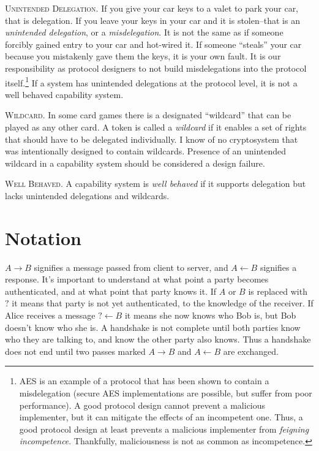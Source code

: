 \documentclass[12pt]{article}
\begin{document}
\textsc{Unintended Delegation}. If you give your car keys to a valet
to park your car, that is delegation. If you leave your keys in your
car and it is stolen--that is an \emph{unintended delegation},
or a \emph{misdelegation}. It is not the same as if someone forcibly
gained entry to your car and hot-wired it. If someone ``steals'' your
car because you mistakenly gave them the keys, it is your own fault.
It is our responsibility as protocol designers to not build
misdelegations into the protocol itself.\footnote{
  AES is an example of a protocol that has been shown to contain a
  misdelegation\cite{aestiming}  (secure AES implementations are possible,
  but suffer from poor performance).
  A good protocol design  cannot prevent a malicious implementer,
  but it can  mitigate the effects of
  an incompetent one. Thus, a good protocol design at least prevents
  a malicious implementer from \emph{feigning incompetence}\cite{underhanded}.
  Thankfully, maliciousness is not as common as incompetence.
} If a system has unintended delegations at the protocol level,
it is not a well behaved capability system.

\textsc{Wildcard}. In some card games there is a designated ``wildcard''
that can be played as any other card. A token is called a \emph{wildcard}
if it enables a set of rights that should have to be delegated
individually.
I know of no cryptosystem that was intentionally designed to contain
wildcards. Presence of an unintended wildcard in a capability
system should be considered a design failure.

\textsc{Well Behaved}. A capability system is
\emph{well behaved} if it supports delegation but lacks unintended
delegations and wildcards.

\section{Notation}

$A \to B$ signifies a message passed from client to server, and
$A \gets B$ signifies a response. It's important to understand
at what point a party becomes authenticated, and at what point
that party knows it. If $A$ or $B$ is replaced with $?$ it
means that party is not yet authenticated, to the knowledge
of the receiver. If Alice receives a message $? \gets B$ it means
she now knows who Bob is, but Bob doesn't know who she is.
A handshake is not complete until both parties know who they are
talking to, and know the other party also knows. Thus a handshake
does not end until two passes marked $A \to B$ and $A \gets B$
are exchanged.
\end{document}
